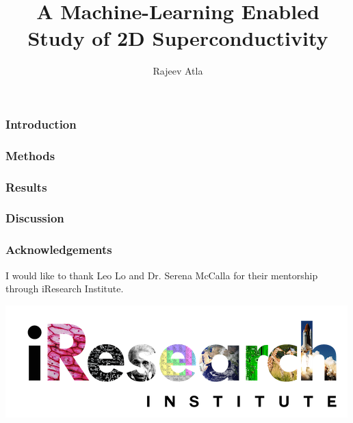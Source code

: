 \documentclass{beamer}
\author{Rajeev Atla}
\title{A Machine-Learning Enabled Study of 2D Superconductivity}
\begin{document}
\frame{\titlepage}



\begin{frame}
\frametitle{Introduction}


\end{frame}

\begin{frame}
\frametitle{Methods}

\end{frame}

\begin{frame}
\frametitle{Results}

\end{frame}


\begin{frame}
\frametitle{Discussion}

\end{frame}

\begin{frame}
\frametitle{Acknowledgements}
I would like to thank Leo Lo and Dr. Serena McCalla for their mentorship through iResearch Institute.

\includegraphics[scale = 0.6]{iresearch.png}


\end{frame}
\end{document}

